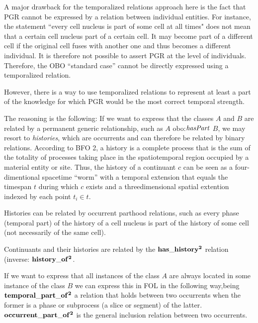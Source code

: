 A major drawback for the temporalized relations approach here is the fact that PGR cannot be expressed by a relation between individual entities. For instance, the statement ``every cell nucleus is part of some cell at all times" does not mean that a certain cell nucleus part of a certain cell. It may become part of a different cell if the original cell fuses with another one and thus becomes a different individual. It is therefore not possible to assert PGR at the level of individuals. Therefore, the OBO ``standard case'' cannot be directly expressed using a temporalized relation.

However, there is a way to use temporalized relations to represent at least a part of the knowledge for which PGR would be the most correct temporal strength.

The reasoning is the following: If we want to express that the classes $A$ and $B$ are related by a permanent generic relationship, such as $A$ obo:$\mathit{hasPart}$ $B$, we may resort to \emph{histories}, which are occurrents and can therefore be related by binary relations. According to BFO 2, a history is a complete process that is the sum of the totality of processes taking place in the spatiotemporal region occupied by a material entity or site. Thus, the history of a continuant $c$ can be seen as a four-dimentional spacetime ``worm'' with a temporal extension that equals the timespan $t$ during which $c$ exists and a threedimensional spatial extention indexed by each point $t_i \in t$. 

Histories can be related by occurrent parthood relations, such as every phase (temporal part) of the history of a cell nucleus is part of the history of some cell (not necessarily of the same cell).  

Continuants and their histories are related by the $\mathrm{\mathbf{has\_history^2}}$ relation (inverse: $\mathrm{\mathbf{history\_of^2}}$.

If we want to express that all instances of the class $A$ are always located in some instance of the class $B$ we can express this in FOL in the following way,being $\mathrm{\mathbf{temporal\_part\_of^2}}$ a relation that holds between two occurrents when the former is a phase or subprocess (a slice or segment) of the latter. $\mathrm{\mathbf{occurrent\_part\_of^2}}$ is the general inclusion relation between two occurrents. 


